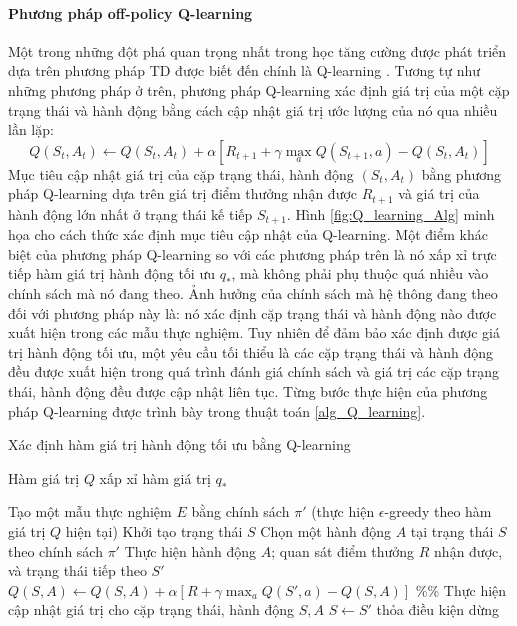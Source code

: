 \paragraph*{Phương pháp off-policy Q-learning}
 Một trong những đột phá quan trọng nhất trong học tăng cường được phát triển dựa trên phương pháp TD được biết đến chính là Q-learning \cite{sutton1998introduction}. Tương tự như những phương pháp ở trên, phương pháp Q-learning xác định giá trị của một cặp trạng thái và hành động bằng cách cập nhật giá trị ước lượng của nó qua nhiều lần lặp:
 \begin{equation}
	 Q(\mathit{S}_t, \mathit{A}_t) \leftarrow Q(\mathit{S}_t, \mathit{A}_t) + \alpha \left[\mathit{R}_{t+1} + \gamma\max_{a}Q(\mathit{S}_{t+1}, a) - Q(\mathit{S}_t, \mathit{A}_t)\right]
 \end{equation}
Mục tiêu cập nhật giá trị của cặp trạng thái, hành động $(\mathit{S}_{t}, \mathit{A}_{t})$ bằng phương pháp Q-learning dựa trên giá trị điểm thưởng nhận được $\mathit{R}_{t+1}$ và giá trị của hành động lớn nhất ở trạng thái kế tiếp $\mathit{S}_{t+1}$. Hình \ref{fig:Q_learning_Alg} minh họa cho cách thức xác định mục tiêu cập nhật của Q-learning. 
Một điểm khác biệt của phương pháp Q-learning so với các phương pháp trên là nó xấp xỉ trực tiếp hàm giá trị hành động tối ưu $q_*$, mà không phải phụ thuộc quá nhiều vào chính sách mà nó đang theo. Ảnh hưởng của chính sách mà hệ thông đang theo đối với phương pháp này là: nó xác định cặp trạng thái và hành động nào được xuất hiện trong các mẫu thực nghiệm. Tuy nhiên để đảm bảo xác định được giá trị hành động tối ưu, một yêu cầu tối thiểu là các cặp trạng thái và hành động đều được xuất hiện trong quá trình đánh giá chính sách và giá trị các cặp trạng thái, hành động đều được cập nhật liên tục. Từng bước thực hiện của phương pháp Q-learning được trình bày trong thuật toán \ref{alg_Q_learning}.
\begin{algorithm}
	\caption{Xác định hàm giá trị hành động tối ưu bằng Q-learning}
	\label{alg_Q_learning}
	\begin{algorithmic}[1]
		\renewcommand{\algorithmicrequire}{\textbf{Đầu vào:}}
		\renewcommand{\algorithmicensure}{\textbf{Đầu ra:}}
		\algnewcommand{}
		\algnewcommand\Operation{\item[\algorithmicoperation]}
		
		\Require
		\Ensure Hàm giá trị $Q$ xấp xỉ hàm giá trị $q_{*}$
		
		\Operation
		\Repeat
		\State Tạo một mẫu thực nghiệm $E$ bằng chính sách $\pi'$ (thực hiện $\epsilon$-greedy theo hàm giá trị $Q$ hiện tại)
		\State Khởi tạo trạng thái $S$
		\State Chọn một hành động $A$ tại trạng thái $S$ theo chính sách $\pi'$
		\State Thực hiện hành động $A$; quan sát điểm thưởng $R$ nhận được, và trạng thái tiếp theo $S'$
		\State $Q(S,A) \leftarrow Q(S,A) + \alpha \left[R + \gamma\max_{a}Q(S', a) - Q(S,A)\right]$ \%\% Thực hiện cập nhật giá trị cho cặp trạng thái, hành động $S,A$
		\State $S \leftarrow S'$
		\EndFor
		\Until thỏa điều kiện dừng
	\end{algorithmic}
\end{algorithm}

